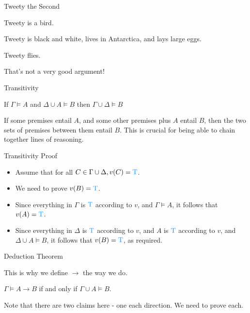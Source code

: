 \documentclass[
  ignorenonframetext,
]{beamer}
\providecommand{\tightlist}{%
  \setlength{\itemsep}{0pt}\setlength{\parskip}{0pt}}
\renewcommand{\,}{\text{, }}
\renewenvironment*{quote}	
	{\list{}{\rightmargin   \leftmargin} \item } 	
	{\endlist }
\newcommand{\DisplayArg}[2]{
\begin{enumerate}
{#1}
\end{enumerate}
\vspace{-6pt}
\hrulefill

\begin{quote}
{\normalfont #2}
\end{quote}
\vspace{12pt}
}
\def\True{\textcolor{dodgerblue}{\text{T}}}
\begin{document}
\begin{frame}{Tweety the Second}
\protect\hypertarget{tweety-the-second}{}

\DisplayArg{ \item Tweety is a bird. \item Tweety is black and white, lives in Antarctica, and lays large eggs. } { Tweety flies. } \bigskip

That's not a very good argument!

\end{frame}

\begin{frame}{Transitivity}
\protect\hypertarget{transitivity}{}

\begin{quote}
If \(\Gamma \vDash A\) and \(\Delta \cup A \vDash B\) then
\(\Gamma \cup \Delta \vDash B\)
\end{quote}

If some premises entail \(A\), and some other premises plus \(A\) entail
\(B\), then the two sets of premises between them entail \(B\).
\pause This is crucial for being able to chain together lines of
reasoning.

\end{frame}

\begin{frame}{Transitivity Proof}
\protect\hypertarget{transitivity-proof}{}

\begin{itemize}
\tightlist
\item
  Assume that for all \(C \in \Gamma \cup \Delta, v(C) = \True\).
\item
  We need to prove \(v(B) = \True\).\pause
\item
  Since everything in \(\Gamma\) is \(\True\) according to \(v\), and
  \(\Gamma \vDash A\), it follows that \(v(A) = \True\).\pause
\item
  Since everything in \(\Delta\) is \(\True\) according to \(v\), and
  \(A\) is \(\True\) according to \(v\), and \(\Delta \cup A \vDash B\),
  it follows that \(v(B) = \True\), as required.
\end{itemize}

\end{frame}

\begin{frame}{Deduction Theorem}
\protect\hypertarget{deduction-theorem}{}

This is why we define \(\rightarrow\) the way we do.

\begin{quote}
\(\Gamma \vDash A \rightarrow B\) if and only if
\(\Gamma \cup A \vDash B\).
\end{quote}

Note that there are two claims here - one each direction. We need to
prove each.

\end{frame}
\end{document}

